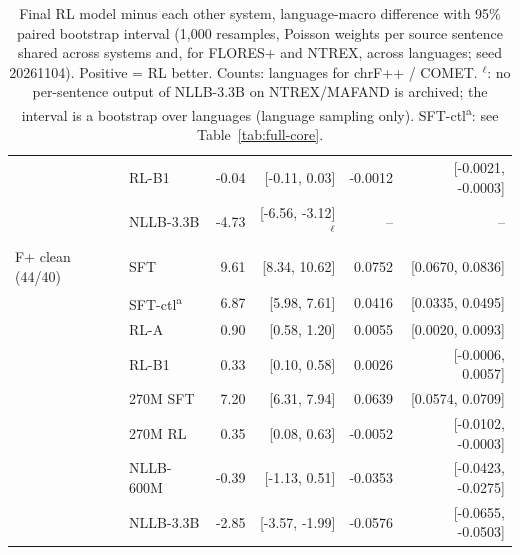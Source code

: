 \begin{table}[htbp]
{\begin{tabular}{@{}llrrrr@{}}
 & RL-B1 & -0.04 & [-0.11, 0.03] & -0.0012 & [-0.0021, -0.0003] \\
 & NLLB-3.3B & -4.73 & [-6.56, -3.12]$^{\ell}$ & -- & -- \\
\midrule
F+ clean (44/40) & SFT & 9.61 & [8.34, 10.62] & 0.0752 & [0.0670, 0.0836] \\
 & SFT-ctl\textsuperscript{a} & 6.87 & [5.98, 7.61] & 0.0416 & [0.0335, 0.0495] \\
 & RL-A & 0.90 & [0.58, 1.20] & 0.0055 & [0.0020, 0.0093] \\
 & RL-B1 & 0.33 & [0.10, 0.58] & 0.0026 & [-0.0006, 0.0057] \\
 & 270M SFT & 7.20 & [6.31, 7.94] & 0.0639 & [0.0574, 0.0709] \\
 & 270M RL & 0.35 & [0.08, 0.63] & -0.0052 & [-0.0102, -0.0003] \\
 & NLLB-600M & -0.39 & [-1.13, 0.51] & -0.0353 & [-0.0423, -0.0275] \\
 & NLLB-3.3B & -2.85 & [-3.57, -1.99] & -0.0576 & [-0.0655, -0.0503] \\
\bottomrule
\end{tabular}%
}
\caption{Final RL model minus each other system, language-macro difference with 95\% paired bootstrap interval (1,000 resamples, Poisson weights per source sentence shared across systems and, for FLORES+ and NTREX, across languages; seed 20261104). Positive = RL better. Counts: languages for chrF++ / COMET. $^{\ell}$: no per-sentence output of NLLB-3.3B on NTREX/MAFAND is archived; the interval is a bootstrap over languages (language sampling only). SFT-ctl\textsuperscript{a}: see Table~\ref{tab:full-core}.}
\label{tab:full-paired}
\end{table}
